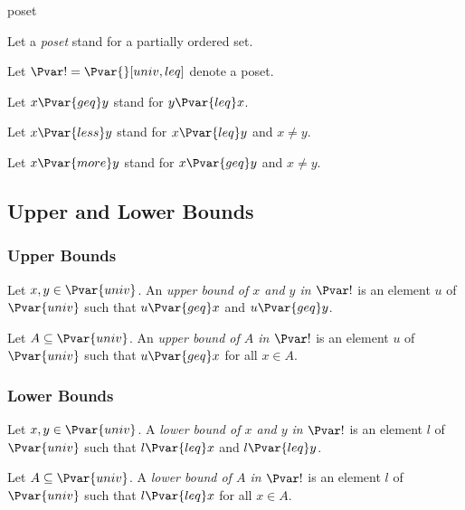 \documentclass{stex}
\begin{document}
\begin{smodule}{poset}
\begin{forthel}
    Let a \emph{poset} stand for a partially ordered set.

    Let $\Pvar! = \Pvar{}[univ,leq]$ denote a poset.

    Let $x {\Pvar{geq}} y$ stand for $y {\Pvar{leq}} x$.

    Let $x {\Pvar{less}} y$ stand for $x {\Pvar{leq}} y$ and $x\neq y$.

    Let $x {\Pvar{more}} y$ stand for $x {\Pvar{geq}} y$ and $x\neq y$.
  \end{forthel}

  \subsection{Upper and Lower Bounds}

  \subsubsection{Upper Bounds}

  \begin{forthel}
    \begin{definition*}
      Let $x, y \in \Pvar{univ}$.
      An \emph{upper bound of $x$ and $y$ in $\Pvar!$} is an element $u$ of $\Pvar{univ}$ such that $u {\Pvar{geq}} x$ and $u {\Pvar{geq}} y$.
    \end{definition*}
    
    \begin{definition*}
      Let $A \subseteq \Pvar{univ}$.
      An \emph{upper bound of $A$ in $\Pvar!$} is an element $u$ of $\Pvar{univ}$ such that $u {\Pvar{geq}} x$ for all $x \in A$.
    \end{definition*}
  \end{forthel}

  \subsubsection{Lower Bounds}

  \begin{forthel}    
    \begin{definition*}
      Let $x, y \in \Pvar{univ}$.
      A \emph{lower bound of $x$ and $y$ in $\Pvar!$} is an element $l$ of $\Pvar{univ}$ such that $l {\Pvar{leq}} x$ and $l {\Pvar{leq}} y$.
    \end{definition*}
    
    \begin{definition*}
      Let $A \subseteq \Pvar{univ}$.
      A \emph{lower bound of $A$ in $\Pvar!$} is an element $l$ of $\Pvar{univ}$ such that $l {\Pvar{leq}} x$ for all $x \in A$.
    \end{definition*}
  \end{forthel}


\end{smodule}
\end{document}
